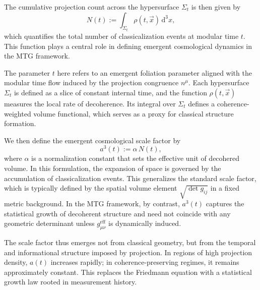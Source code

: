 \documentclass[11pt]{article}
\begin{document}
The cumulative projection count across the hypersurface \( \Sigma_t \) is then given by
\begin{equation}
N(t) := \int_{\Sigma_t} \rho(t, \vec{x}) \, \mathrm{d}^3 x,
\end{equation}
which quantifies the total number of classicalization events at modular time \( t \). This function plays a central role in defining emergent cosmological dynamics in the MTG framework.

The parameter \( t \) here refers to an emergent foliation parameter aligned with the modular time flow induced by the projection congruence \( n^\mu \). Each hypersurface \( \Sigma_t \) is defined as a slice of constant internal time, and the function \( \rho(t, \vec{x}) \) measures the local rate of decoherence. Its integral over \( \Sigma_t \) defines a coherence-weighted volume functional, which serves as a proxy for classical structure formation.

We then define the emergent cosmological scale factor by
\begin{equation}\label{eq:a-meas-event}
a^3(t) := \alpha \, N(t),
\end{equation}
where \( \alpha \) is a normalization constant that sets the effective unit of decohered volume. In this formulation, the expansion of space is governed by the accumulation of classicalization events. This generalizes the standard scale factor, which is typically defined by the spatial volume element \( \sqrt{\det g_{ij}} \) in a fixed metric background. In the MTG framework, by contrast, \( a^3(t) \) captures the statistical growth of decoherent structure and need not coincide with any geometric determinant unless \( g_{\mu\nu}^{\mathrm{eff}} \) is dynamically induced.

The scale factor thus emerges not from classical geometry, but from the temporal and informational structure imposed by projection. In regions of high projection density, \( a(t) \) increases rapidly; in coherence-preserving regimes, it remains approximately constant. This replaces the Friedmann equation with a statistical growth law rooted in measurement history.
\end{document}
